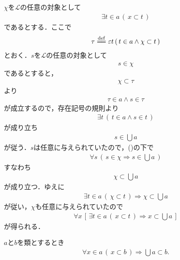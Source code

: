 	\begin{sketch}
		$\chi$を$\mathcal{L}$の任意の対象として
		\begin{align}
			\exists t \in a\, (\, x \subset t\, )
			\label{fom:thm_union_is_bigger_than_any_member_1}
		\end{align}
		であるとする．ここで
		\begin{align}
			\tau \defeq \varepsilon t\, (\, t \in a \wedge \chi \subset t\, )
		\end{align}
		とおく．$s$を$\mathcal{L}$の任意の対象として
		\begin{align}
			s \in \chi
		\end{align}
		であるとすると，
		\begin{align}
			\chi \subset \tau
		\end{align}
		より
		\begin{align}
			\tau \in a \wedge s \in \tau
		\end{align}
		が成立するので，存在記号の規則より
		\begin{align}
			\exists t\, \left(\, t \in a \wedge s \in t\, \right)
		\end{align}
		が成り立ち
		\begin{align}
			s \in \bigcup a
		\end{align}
		が従う．$s$は任意に与えられていたので，()の下で
		\begin{align}
			\forall s\, (\, s \in \chi \Longrightarrow s \in \bigcup a\, )
		\end{align}
		すなわち
		\begin{align}
			\chi \subset \bigcup a
		\end{align}
		が成り立つ．ゆえに
		\begin{align}
			\exists t \in a\, \left(\, \chi \subset t\, \right) \Longrightarrow \chi \subset \bigcup a
		\end{align}
		が従い，$\chi$も任意に与えられていたので
		\begin{align}
			\forall x\, \left[\, \exists t \in a\, (\, x \subset t\, ) \Longrightarrow x \subset \bigcup a\, \right]
		\end{align}
		が得られる．
		\QED
	\end{sketch}
	
	\begin{screen}
		\begin{thm}[部分集合の合併は部分類]\label{thm:union_of_subsets_is_subclass}
			$a$と$b$を類とするとき
			\begin{align}
				\forall x \in a\, (\, x \subset b\, ) \Longrightarrow \bigcup a \subset b.
			\end{align}
		\end{thm}
	\end{screen}
	
